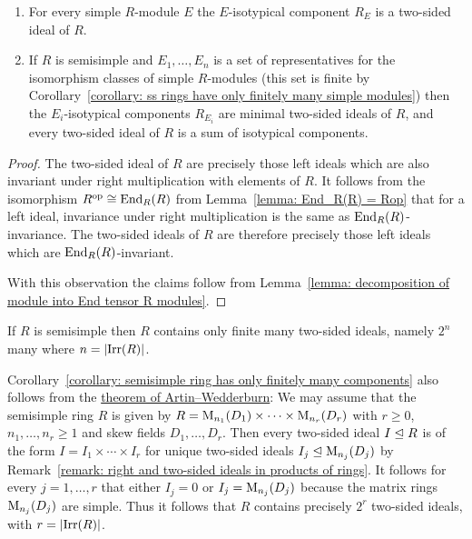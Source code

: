 \begin{corollary}
  \label{corollary: isotypical components as two sided ideals}
  \leavevmode
  \begin{enumerate}
    \item
      For every simple $R$-module $E$ the $E$-isotypical component $R_E$ is a two-sided ideal of $R$.
    \item
      If $R$ is semisimple and $E_1, \dotsc, E_n$ is a set of representatives for the isomorphism classes of simple $R$-modules (this set is finite by Corollary~\ref{corollary: ss rings have only finitely many simple modules}) then the $E_i$-isotypical components $R_{E_i}$ are minimal two-sided ideals of $R$, and every two-sided ideal of $R$ is a sum of isotypical components.
  \end{enumerate}
\end{corollary}


\begin{proof}
    The two-sided ideal of $R$ are precisely those left ideals which are also invariant under right multiplication with elements of $R$.
    It follows from the isomorphism $R^{\operatorname{op}} \cong \operatorname{End}_R(R)$ from Lemma~\ref{lemma: End_R(R) = Rop} that for a left ideal, invariance under right multiplication is the same as $\operatorname{End}_R(R)$-invariance.
    The two-sided ideals of $R$ are therefore precisely those left ideals which are $\operatorname{End}_R(R)$-invariant.
    
    With this observation the claims follow from Lemma~\ref{lemma: decomposition of module into End tensor R modules}.
\end{proof}


\begin{corollary}
  \label{corollary: semisimple ring has only finitely many components}
  If $R$ is semisimple then $R$ contains only finite many two-sided ideals, namely $2^n$ many where $n = |{\operatorname{Irr}(R)}|$.
\end{corollary}


\begin{remark}
  Corollary~\ref{corollary: semisimple ring has only finitely many components} also follows from the \hyperref[theorem: artin wedderburn theorem]{theorem of Artin--Wedderburn}:
  We may assume that the semisimple ring $R$ is given by $R = \operatorname{M}_{n_1}(D_1) \times \dotsb \times \operatorname{M}_{n_r}(D_r)$ with $r \geq 0$, $n_1, \dotsc, n_r \geq 1$ and skew fields $D_1, \dotsc, D_r$.
  Then every two-sided ideal $I \trianglelefteq R$ is of the form $I = I_1 \times \dotsb \times I_r$ for unique two-sided ideals $I_j \trianglelefteq \operatorname{M}_{n_j}(D_j)$ by Remark~\ref{remark: right and two-sided ideals in products of rings}.
  It follows for every $j = 1, \dotsc, r$ that either $I_j = 0$ or $I_j = \operatorname{M}_{n_j}(D_j)$ because the matrix rings $\operatorname{M}_{n_j}(D_j)$ are simple.
  Thus it follows that $R$ contains precisely $2^r$ two-sided ideals, with $r = |{\operatorname{Irr}(R)}|$.
\end{remark}


